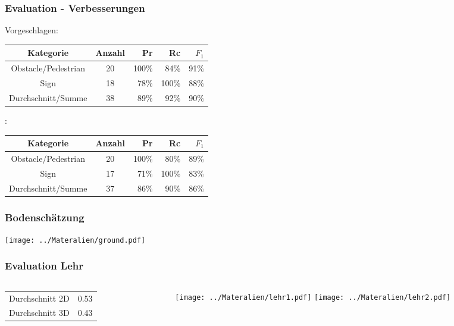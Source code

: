 \begin{frame}
    \frametitle{Evaluation - Verbesserungen}
    \hspace*{-0.5cm}
    Vorgeschlagen:

    \hspace*{-0.5cm}
    \begin{tabular}{c|c|rrr}
        \toprule
        Kategorie & Anzahl & Pr & Rc & $F_1$\\
        \midrule
        Obstacle/Pedestrian & 20 & 100\% & 84\% & 91\% \\
        Sign & 18 & 78\% & 100\% & 88\% \\
        \midrule
        Durchschnitt/Summe & 38 & 89\% & 92\% & 90\% \\
        \bottomrule
    \end{tabular}

    \vspace{0.5cm}
    \hspace*{-0.5cm}
    \cite{AttBen17}:

    \hspace*{-0.5cm}
    \begin{tabular}{c|c|rrr}
        \toprule
        Kategorie & Anzahl & Pr & Rc & $F_1$\\
        \midrule
        Obstacle/Pedestrian & 20 & 100\% & 80\% & 89\% \\
        Sign & 17 & 71\% & 100\% & 83\% \\
        \midrule
        Durchschnitt/Summe& 37 & 86\% & 90\% & 86\% \\
        \bottomrule
    \end{tabular}
\end{frame}

\begin{frame}
    \frametitle{Bodenschätzung}
    \texttt{[image: ../Materalien/ground.pdf]}
\end{frame}

\begin{frame}
    \frametitle{Evaluation Lehr}
    \begin{columns}
        \begin{column}{.5\textwidth}
            \begin{tabular}{cc}
                \toprule
                Durchschnitt 2D & 0.53\\
                Durchschnitt 3D & 0.43 \\
                \bottomrule
            \end{tabular}
        \end{column}
        \begin{column}{.5\textwidth}
            \texttt{[image: ../Materalien/lehr1.pdf]}
            \texttt{[image: ../Materalien/lehr2.pdf]}
        \end{column}
    \end{columns}
\end{frame}
